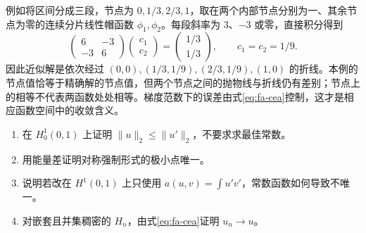 例如将区间分成三段，节点为 $0,1/3,2/3,1$，取在两个内部节点分别为一、其余节点为零的连续分片线性帽函数 $\phi_1,\phi_2$。每段斜率为 $3$、$-3$ 或零，直接积分得到
\[
 \begin{pmatrix}6&-3\\-3&6\end{pmatrix}
 \begin{pmatrix}c_1\\c_2\end{pmatrix}
 =\begin{pmatrix}1/3\\1/3\end{pmatrix},
 \qquad c_1=c_2=1/9.
\]
因此近似解是依次经过 $(0,0),(1/3,1/9),(2/3,1/9),(1,0)$ 的折线。本例的节点值恰等于精确解的节点值，但两个节点之间的抛物线与折线仍有差别；节点上的相等不代表两函数处处相等。梯度范数下的误差由式\eqref{eq:fa-cea}控制，这才是相应函数空间中的收敛含义。
\begin{enumerate}
 \item 在 $H_0^1(0,1)$ 上证明 $\|u\|_2\leq\|u'\|_2$，不要求求最佳常数。
 \item 用能量差证明对称强制形式的极小点唯一。
 \item 说明若改在 $H^1(0,1)$ 上只使用 $a(u,v)=\int u'v'$，常数函数如何导致不唯一。
 \item\label{exer:fa-galerkin} 对嵌套且并集稠密的 $H_n$，由式\eqref{eq:fa-cea}证明 $u_n\to u$。
\end{enumerate}

